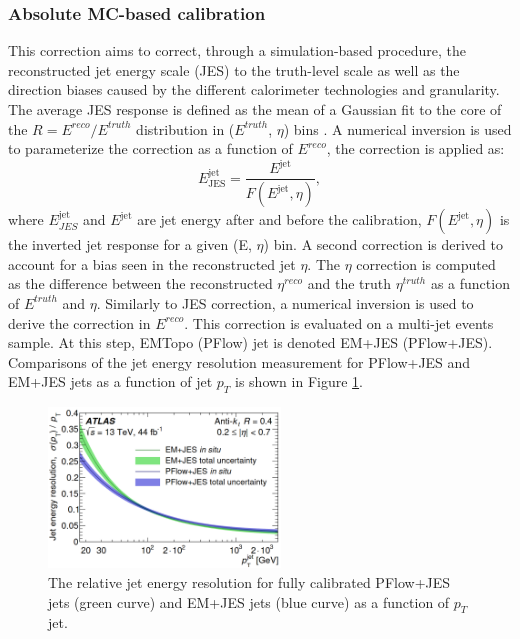 \subsubsection{Absolute MC-based calibration}
\label{Jet:Cal:chain:JES}
This correction aims to correct, through a simulation-based procedure, the reconstructed jet energy scale (JES) to the truth-level scale as well as the direction biases caused by the different calorimeter technologies and granularity. The average JES response is defined as the mean of a Gaussian fit to the core of the $R=E^{reco}/E^{truth}$ distribution in ($E^{truth}$, $\eta$) bins \cite{Old_JES, Old_JES_Sys}. A numerical inversion is used to parameterize the correction as a function of $E^{reco}$, the correction is applied as: 
\begin{equation}
    E_{\text{JES}}^{\mathrm{jet}}=\frac{E^{\mathrm{jet}}}{F(E^{\mathrm{jet}},\eta)},
\end{equation}
where $E_{JES}^{\mathrm{jet}}$ and $E^{\mathrm{jet}}$ are jet energy after and before the  calibration, $F(E^{\mathrm{jet}}, \eta)$ is the inverted jet response for a given (E, $\eta$) bin. A second correction is derived to account for a bias seen in the reconstructed jet $\eta$. The $\eta$ correction is computed as the difference between the reconstructed $\eta^{reco}$ and the truth $\eta^{truth}$ as a function of $E^{truth}$ and $\eta$. Similarly to JES correction, a numerical inversion is used to derive the correction in $E^{reco}$. This correction is evaluated on a multi-jet events sample. At this step, EMTopo (PFlow) jet is denoted EM+JES (PFlow+JES). Comparisons of the jet energy resolution measurement for PFlow+JES and EM+JES jets as a function of jet $p_T$ is shown in Figure \ref{fig:Jet:Cal:chain:JER}.
\begin{figure}[htbp]
    \centering
    \includegraphics[width=0.55\textwidth]{Ch4/Img/Jet_Resolution_Topo_vs_PFlow.png}
    \caption{The relative jet energy resolution for fully calibrated PFlow+JES jets (green curve) and EM+JES jets (blue curve) as a function of $p_T$ jet.}
    \label{fig:Jet:Cal:chain:JER}
\end{figure}

